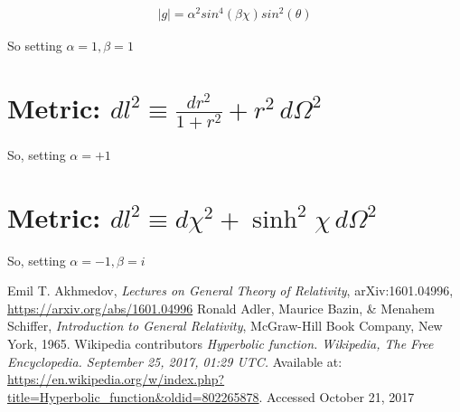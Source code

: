 \documentclass[]{article}
\begin{document}
\begin{align*}
|g|=\alpha^2sin^4{(\beta\chi)}sin^2{(\theta)}
\end{align*}

So setting $\alpha=1,\beta=1$ 
\section{Metric: $dl^2\equiv\frac{dr^2}{1+r^2}+r^2\,d\Omega^2$}  \label{section:metric3}
So, setting $\alpha=+1$
\section{Metric: $dl^2\equiv d\chi^2+\sinh^2 \chi\,d\Omega^2$} \label{section:metric4}

So, setting $\alpha=-1,\beta=i$
\begin{thebibliography}{9}\label{section:biblio}
	\raggedright
	Emil T. Akhmedov,
	\emph{Lectures on General Theory of Relativity},
	arXiv:1601.04996,
	\url{https://arxiv.org/abs/1601.04996}
	Ronald Adler, Maurice Bazin, \& Menahem Schiffer,
	\emph{Introduction to General Relativity},
	McGraw-Hill Book Company, New York,
	1965.
	Wikipedia contributors
	\emph{Hyperbolic function. Wikipedia, The Free Encyclopedia. September 25, 2017, 01:29 UTC.}
	 Available at: 
	 \url{https://en.wikipedia.org/w/index.php?title=Hyperbolic_function&oldid=802265878}. Accessed October 21, 2017
\end{thebibliography}
\end{document}
